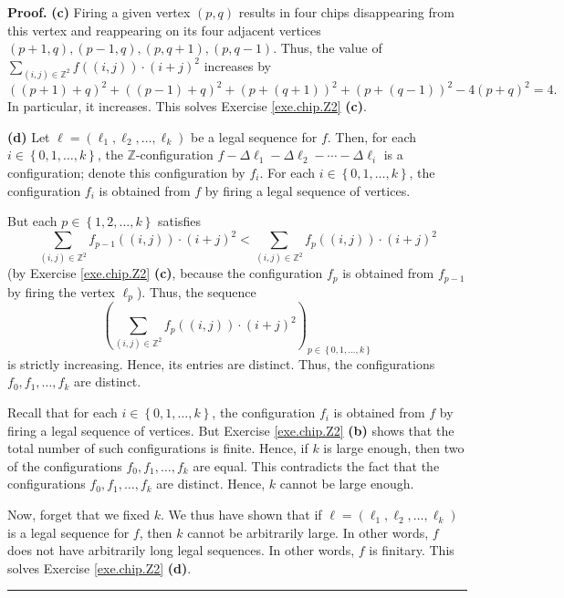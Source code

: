 \documentclass[numbers=enddot,12pt,final,onecolumn,notitlepage]{scrartcl}%
\theoremstyle{definition}
\newenvironment{proof}[1][Proof]{\noindent\textbf{#1.} }{\ \rule{0.5em}{0.5em}}
\let\sumnonlimits\sum
\renewcommand{\sum}{\sumnonlimits\limits}
\begin{document}
\begin{proof}
\textbf{(c)} Firing a given vertex $\left(  p,q\right)  $ results in four
chips disappearing from this vertex and reappearing on its four adjacent
vertices $\left(  p+1,q\right)  ,\left(  p-1,q\right)  ,\left(  p,q+1\right)
,\left(  p,q-1\right)  $. Thus, the value of $\sum_{\left(  i,j\right)
\in\mathbb{Z}^{2}}f\left(  \left(  i,j\right)  \right)  \cdot\left(
i+j\right)  ^{2}$ increases by%
\[
\left(  \left(  p+1\right)  +q\right)  ^{2}+\left(  \left(  p-1\right)
+q\right)  ^{2}+\left(  p+\left(  q+1\right)  \right)  ^{2}+\left(  p+\left(
q-1\right)  \right)  ^{2}-4\left(  p+q\right)  ^{2}=4.
\]
In particular, it increases. This solves Exercise \ref{exe.chip.Z2}
\textbf{(c)}.

\textbf{(d)} Let $\ell=\left(  \ell_{1},\ell_{2},\ldots,\ell_{k}\right)  $ be
a legal sequence for $f$. Then, for each $i\in\left\{  0,1,\ldots,k\right\}
$, the $\mathbb{Z}$-configuration $f-\Delta\ell_{1}-\Delta\ell_{2}%
-\cdots-\Delta\ell_{i}$ is a configuration; denote this configuration by
$f_{i}$. For each $i\in\left\{  0,1,\ldots,k\right\}  $, the configuration
$f_{i}$ is obtained from $f$ by firing a legal sequence of vertices.

But each $p\in\left\{  1,2,\ldots,k\right\}  $ satisfies
\[
\sum_{\left(  i,j\right)  \in\mathbb{Z}^{2}}f_{p-1}\left(  \left(  i,j\right)
\right)  \cdot\left(  i+j\right)  ^{2}<\sum_{\left(  i,j\right)  \in
\mathbb{Z}^{2}}f_{p}\left(  \left(  i,j\right)  \right)  \cdot\left(
i+j\right)  ^{2}%
\]
(by Exercise \ref{exe.chip.Z2} \textbf{(c)}, because the configuration $f_{p}$
is obtained from $f_{p-1}$ by firing the vertex $\ell_{p}$). Thus, the
sequence%
\[
\left(  \sum_{\left(  i,j\right)  \in\mathbb{Z}^{2}}f_{p}\left(  \left(
i,j\right)  \right)  \cdot\left(  i+j\right)  ^{2}\right)  _{p\in\left\{
0,1,\ldots,k\right\}  }%
\]
is strictly increasing. Hence, its entries are distinct. Thus, the
configurations $f_{0},f_{1},\ldots,f_{k}$ are distinct.

Recall that for each $i\in\left\{  0,1,\ldots,k\right\}  $, the configuration
$f_{i}$ is obtained from $f$ by firing a legal sequence of vertices. But
Exercise \ref{exe.chip.Z2} \textbf{(b)} shows that the total number of such
configurations is finite. Hence, if $k$ is large enough, then two of the
configurations $f_{0},f_{1},\ldots,f_{k}$ are equal. This contradicts the fact
that the configurations $f_{0},f_{1},\ldots,f_{k}$ are distinct. Hence, $k$
cannot be large enough.

Now, forget that we fixed $k$. We thus have shown that if $\ell=\left(
\ell_{1},\ell_{2},\ldots,\ell_{k}\right)  $ is a legal sequence for $f$, then
$k$ cannot be arbitrarily large. In other words, $f$ does not have arbitrarily
long legal sequences. In other words, $f$ is finitary. This solves Exercise
\ref{exe.chip.Z2} \textbf{(d)}.
\end{proof}
\end{document}

